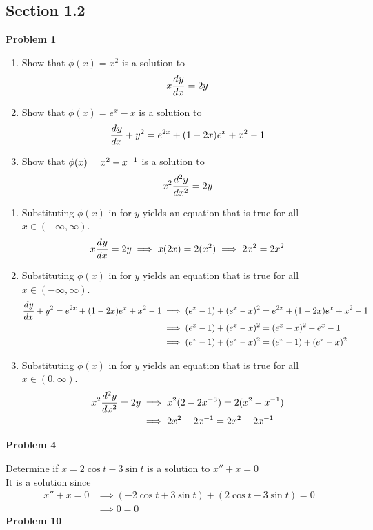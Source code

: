 \subsection*{Section 1.2}
\textbf{Problem 1}
\begin{enumerate}
    \item Show that $\phi(x) = x^2$ is a solution to 
        \[
            x\der{y}{x} = 2y
        \]
    \item Show that $\phi(x) = e^x-x$ is a solution to 
        \[
            \der{y}{x} + y^2 = e^{2x} + (1-2x)e^x + x^2 -1
        \]
    \item Show that $\phi(x) = x^2 - x\inv$ is a solution to
        \[
            x^2 \der[2]{y}{x} = 2y
        \]
\end{enumerate}
\solution
\begin{enumerate}
    \item Substituting $\phi(x)$ in for $y$ yields an equation 
        that is true for all $x \in (-\infty, \infty)$.
        \[
            x\der{y}{x} = 2y
            \implies x(2x) = 2(x^2)
            \implies 2x^2 = 2x^2
        \]
    \item Substituting $\phi(x)$ in for $y$ yields an equation
        that is true for all $x \in (-\infty, \infty)$.
        \begin{align*}
            \der{y}{x} + y^2 = e^{2x} + (1-2x)e^x + x^2 -1
            &\implies (e^x-1) + (e^x-x)^2 = e^{2x} + (1-2x)e^x + x^2 -1 \\
            &\implies (e^x-1) + (e^x-x)^2 = (e^x-x)^2 + e^x - 1 \\ 
            &\implies (e^x-1) + (e^x-x)^2 = (e^x-1) + (e^x-x)^2
        \end{align*}
    \item Substituting $\phi(x)$ in for $y$ yields an equation
        that is true for all $x \in (0, \infty)$.
        \begin{align*}
            x^2 \der[2]{y}{x} = 2y
            &\implies x^2 (2- 2x^{-3}) = 2(x^2-x\inv) \\
            &\implies 2x^2 - 2x\inv = 2x^2-2x\inv
        \end{align*}
\end{enumerate}
\textbf{Problem 4}

Determine if $x = 2\cos t - 3\sin t$ is a solution to $x''+ x = 0$ \\
\solution
It is a solution since 
\begin{align*}
    x''+ x = 0
    &\implies (-2\cos t + 3\sin t) + (2\cos t - 3\sin t) = 0 \\
    &\implies 0 = 0
\end{align*}
\textbf{Problem 10}

